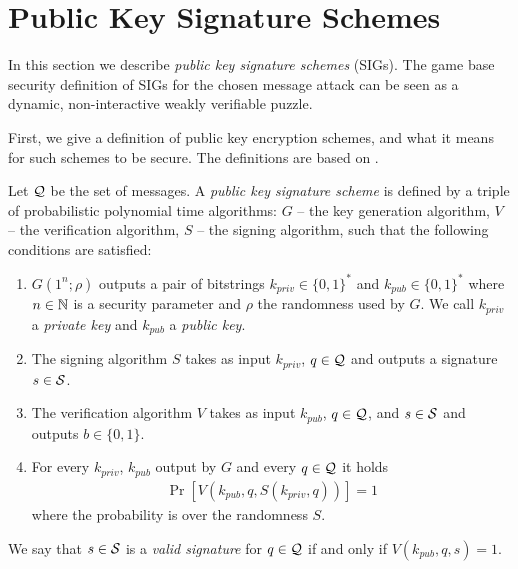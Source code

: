 \section{Public Key Signature Schemes}
\label{section:pks}
In this section we describe \textit{public key signature schemes} (SIGs).
The game base security definition of SIGs for the chosen message attack can be seen as a dynamic,
non-interactive weakly verifiable puzzle.

First, we give a definition of public key encryption schemes, and what it means for such schemes to be secure.
The definitions are based on \cite{Goldreich:2004:FCV:975541}.

\begin{definition}
Let $\mathcal{Q}$ be the set of messages. A \textit{public key signature scheme} is defined by a triple of probabilistic polynomial time algorithms:
$G$ -- the key generation algorithm,
$V$ -- the verification algorithm,
$S$ -- the signing algorithm,
such that the following conditions are satisfied:
\begin{enumerate}[-]
  \item $G(1^n; \rho)$ outputs a pair of bitstrings $k_{priv} \in \{0,1\}^{*}$ and $k_{pub} \in \{0,1\}^{*}$ where $n \in \mathbb{N}$ is a security
    parameter and $\rho$ the randomness used by $G$. We call $k_{priv}$ a \textit{private key} and $k_{pub}$ a \textit{public key}.
  \item The signing algorithm $S$ takes as input $k_{priv}$, $q \in \mathcal{Q}$ and outputs a signature $s \in \mathcal{S}$.
  \item The verification algorithm $V$ takes as input $k_{pub}$, $q \in \mathcal{Q}$, and $s \in \mathcal{S}$ and outputs $b \in \{0,1\}$.
  \item For every $k_{priv}$, $k_{pub}$ output by $G$ and every $q \in \mathcal{Q}$ it holds
    \begin{align*}
      \Pr[V(k_{pub}, q, S(k_{priv}, q))] = 1
    \end{align*}
    where the probability is over the randomness $S$.
\end{enumerate}
\end{definition}
We say that $s \in \mathcal{S}$ is a \textit{valid signature} for $q \in \mathcal{Q}$ if and only if $V(k_{pub}, q, s) = 1$.

